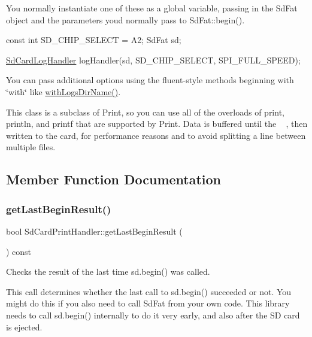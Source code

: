 You normally instantiate one of these as a global variable, passing in the Sd\+Fat object and the parameters you\textquotesingle{}d normally pass to Sd\+Fat\+::begin().


\begin{DoxyCode}
\textcolor{keyword}{const} \textcolor{keywordtype}{int} SD\_CHIP\_SELECT = A2;
SdFat sd;

\mbox{\hyperlink{class_sd_card_log_handler}{SdCardLogHandler}} logHandler(sd, SD\_CHIP\_SELECT, SPI\_FULL\_SPEED);
\end{DoxyCode}


You can pass additional options using the fluent-\/style methods beginning with \char`\"{}with\char`\"{} like \mbox{\hyperlink{class_sd_card_print_handler_aac9a7f9d1a22db39acfc17c4a61c9419}{with\+Logs\+Dir\+Name()}}.

This class is a subclass of Print, so you can use all of the overloads of print, println, and printf that are supported by Print. Data is buffered until the ~\newline
, then written to the card, for performance reasons and to avoid splitting a line between multiple files. 

\subsection{Member Function Documentation}
\mbox{\label{class_sd_card_print_handler_ab8e7ac1b3c60f5545ea297e2f04b9ccf}} 
\subsubsection{\texorpdfstring{get\+Last\+Begin\+Result()}{getLastBeginResult()}}
{\footnotesize\ttfamily bool Sd\+Card\+Print\+Handler\+::get\+Last\+Begin\+Result (\begin{DoxyParamCaption}{ }\end{DoxyParamCaption}) const\hspace{0.3cm}{\ttfamily [inline]}}



Checks the result of the last time sd.\+begin() was called. 

This call determines whether the last call to sd.\+begin() succeeded or not. You might do this if you also need to call Sd\+Fat from your own code. This library needs to call sd.\+begin() internally to do it very early, and also after the SD card is ejected.

